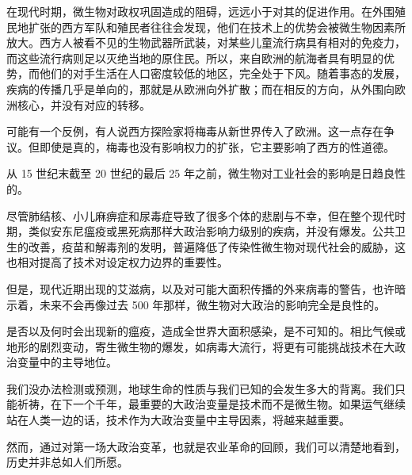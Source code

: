 在现代时期，微生物对政权巩固造成的阻碍，远远小于对其的促进作用。在外围殖民地扩张的西方军队和殖民者往往会发现，他们在技术上的优势会被微生物因素所放大。西方人被看不见的生物武器所武装，对某些儿童流行病具有相对的免疫力，而这些流行病则足以灭绝当地的原住民。所以，来自欧洲的航海者具有明显的优势，而他们的对手生活在人口密度较低的地区，完全处于下风。随着事态的发展，疾病的传播几乎是单向的，那就是从欧洲向外扩散；而在相反的方向，从外围向欧洲核心，并没有对应的转移。

可能有一个反例，有人说西方探险家将梅毒从新世界传入了欧洲。这一点存在争议。但即使是真的，梅毒也没有影响权力的扩张，它主要影响了西方的性道德。

从 15 世纪末截至 20 世纪的最后 25 年之前，微生物对工业社会的影响是日趋良性的。

尽管肺结核、小儿麻痹症和尿毒症导致了很多个体的悲剧与不幸，但在整个现代时期，类似安东尼瘟疫或黑死病那样大政治影响力级别的疾病，并没有爆发。公共卫生的改善，疫苗和解毒剂的发明，普遍降低了传染性微生物对现代社会的威胁，这也相对提高了技术对设定权力边界的重要性。

但是，现代近期出现的艾滋病，以及对可能大面积传播的外来病毒的警告，也许暗示着，未来不会再像过去 500 年那样，微生物对大政治的影响完全是良性的。

是否以及何时会出现新的瘟疫，造成全世界大面积感染，是不可知的。相比气候或地形的剧烈变动，寄生微生物的爆发，如病毒大流行，将更有可能挑战技术在大政治变量中的主导地位。

我们没办法检测或预测，地球生命的性质与我们已知的会发生多大的背离。我们只能祈祷，在下一个千年，最重要的大政治变量是技术而不是微生物。如果运气继续站在人类一边的话，技术作为大政治变量中主导因素，将越来越重要。

然而，通过对第一场大政治变革，也就是农业革命的回顾，我们可以清楚地看到，历史并非总如人们所愿。
